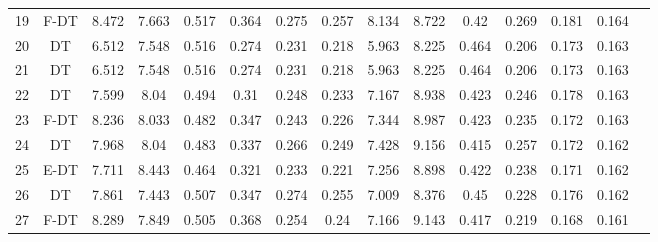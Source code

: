 \begin{longtable}{@{\hskip3pt}c@{\hskip3pt}c@{\hskip3pt}c@{\hskip3pt}c@{\hskip3pt}c@{\hskip3pt}c@{\hskip3pt}c@{\hskip3pt}c@{\hskip3pt}c@{\hskip3pt}c@{\hskip3pt}c@{\hskip3pt}c@{\hskip3pt}c@{\hskip3pt}c@{\hskip3pt}c}
         19 &           F-DT &             8.472 &          7.663 &           0.517 &           0.364 &           0.275 &           0.257 &               8.134 &           8.722 &            0.42 &         0.269 &          0.181 &           0.164 \\
         20 &             DT &             6.512 &          7.548 &           0.516 &           0.274 &           0.231 &           0.218 &               5.963 &           8.225 &           0.464 &         0.206 &          0.173 &           0.163 \\
         21 &             DT &             6.512 &          7.548 &           0.516 &           0.274 &           0.231 &           0.218 &               5.963 &           8.225 &           0.464 &         0.206 &          0.173 &           0.163 \\
         22 &             DT &             7.599 &           8.04 &           0.494 &            0.31 &           0.248 &           0.233 &               7.167 &           8.938 &           0.423 &         0.246 &          0.178 &           0.163 \\
         23 &           F-DT &             8.236 &          8.033 &           0.482 &           0.347 &           0.243 &           0.226 &               7.344 &           8.987 &           0.423 &         0.235 &          0.172 &           0.163 \\
         24 &             DT &             7.968 &           8.04 &           0.483 &           0.337 &           0.266 &           0.249 &               7.428 &           9.156 &           0.415 &         0.257 &          0.172 &           0.162 \\
         25 &           E-DT &             7.711 &          8.443 &           0.464 &           0.321 &           0.233 &           0.221 &               7.256 &           8.898 &           0.422 &         0.238 &          0.171 &           0.162 \\
         26 &             DT &             7.861 &          7.443 &           0.507 &           0.347 &           0.274 &           0.255 &               7.009 &           8.376 &            0.45 &         0.228 &          0.176 &           0.162 \\
         27 &           F-DT &             8.289 &          7.849 &           0.505 &           0.368 &           0.254 &            0.24 &               7.166 &           9.143 &           0.417 &         0.219 &          0.168 &           0.161 \\

\end{longtable}
